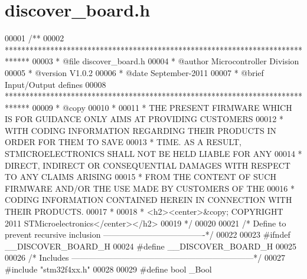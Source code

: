 \section{discover\+\_\+board.\+h}
\label{discover__board_8h_source}

\begin{DoxyCode}
00001  \textcolor{comment}{/**}
00002 \textcolor{comment}{  ******************************************************************************}
00003 \textcolor{comment}{  * @file    discover\_board.h}
00004 \textcolor{comment}{  * @author  Microcontroller Division}
00005 \textcolor{comment}{  * @version V1.0.2}
00006 \textcolor{comment}{  * @date    September-2011}
00007 \textcolor{comment}{  * @brief   Input/Output defines}
00008 \textcolor{comment}{  ******************************************************************************}
00009 \textcolor{comment}{  * @copy}
00010 \textcolor{comment}{  *}
00011 \textcolor{comment}{  * THE PRESENT FIRMWARE WHICH IS FOR GUIDANCE ONLY AIMS AT PROVIDING CUSTOMERS}
00012 \textcolor{comment}{  * WITH CODING INFORMATION REGARDING THEIR PRODUCTS IN ORDER FOR THEM TO SAVE}
00013 \textcolor{comment}{  * TIME. AS A RESULT, STMICROELECTRONICS SHALL NOT BE HELD LIABLE FOR ANY}
00014 \textcolor{comment}{  * DIRECT, INDIRECT OR CONSEQUENTIAL DAMAGES WITH RESPECT TO ANY CLAIMS ARISING}
00015 \textcolor{comment}{  * FROM THE CONTENT OF SUCH FIRMWARE AND/OR THE USE MADE BY CUSTOMERS OF THE}
00016 \textcolor{comment}{  * CODING INFORMATION CONTAINED HEREIN IN CONNECTION WITH THEIR PRODUCTS.}
00017 \textcolor{comment}{  *}
00018 \textcolor{comment}{  * <h2><center>&copy; COPYRIGHT 2011 STMicroelectronics</center></h2>}
00019 \textcolor{comment}{  */}
00020 
00021 \textcolor{comment}{/* Define to prevent recursive inclusion -------------------------------------*/}
00022 
00023 \textcolor{preprocessor}{#}\textcolor{preprocessor}{ifndef} \textcolor{preprocessor}{\_\_DISCOVER\_BOARD\_H}
00024 \textcolor{preprocessor}{#}\textcolor{preprocessor}{define} \textcolor{preprocessor}{\_\_DISCOVER\_BOARD\_H}
00025 
00026 \textcolor{comment}{/* Includes ------------------------------------------------------------------*/}
00027 \textcolor{preprocessor}{#}\textcolor{preprocessor}{include} "stm32f4xx.h"
00028 
00029 \textcolor{preprocessor}{#}\textcolor{preprocessor}{define} \textcolor{keywordtype}{bool} \textcolor{preprocessor}{\_Bool}

\end{DoxyCode}
